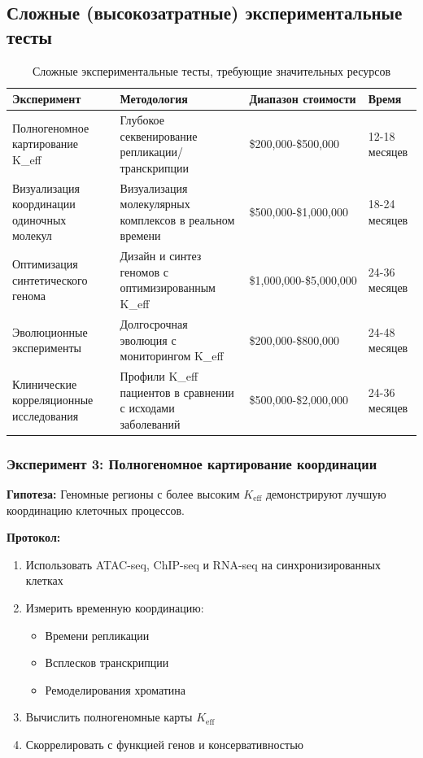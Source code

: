 \documentclass[12pt]{article}
\begin{document}
	\subsection{Сложные (высокозатратные) экспериментальные тесты}
	
	\begin{table}[H]
		\centering
		\caption{Сложные экспериментальные тесты, требующие значительных ресурсов}
		\begin{tabular}{p{4cm}p{5cm}p{3cm}p{2cm}}
			\toprule
			\textbf{Эксперимент} & \textbf{Методология} & \textbf{Диапазон стоимости} & \textbf{Время} \\
			\midrule
			Полногеномное картирование K\_eff & Глубокое секвенирование репликации/транскрипции & \$200,000-\$500,000 & 12-18 месяцев \\
			Визуализация координации одиночных молекул & Визуализация молекулярных комплексов в реальном времени & \$500,000-\$1,000,000 & 18-24 месяцев \\
			Оптимизация синтетического генома & Дизайн и синтез геномов с оптимизированным K\_eff & \$1,000,000-\$5,000,000 & 24-36 месяцев \\
			Эволюционные эксперименты & Долгосрочная эволюция с мониторингом K\_eff & \$200,000-\$800,000 & 24-48 месяцев \\
			Клинические корреляционные исследования & Профили K\_eff пациентов в сравнении с исходами заболеваний & \$500,000-\$2,000,000 & 24-36 месяцев \\
			\bottomrule
		\end{tabular}
	\end{table}
	
	\subsubsection{Эксперимент 3: Полногеномное картирование координации}
	\textbf{Гипотеза:} Геномные регионы с более высоким $K_{\text{eff}}$ демонстрируют лучшую координацию клеточных процессов.
	
	\textbf{Протокол:}
	\begin{enumerate}
		\item Использовать ATAC-seq, ChIP-seq и RNA-seq на синхронизированных клетках
		\item Измерить временную координацию:
		\begin{itemize}
			\item Времени репликации
			\item Всплесков транскрипции
			\item Ремоделирования хроматина
		\end{itemize}
		\item Вычислить полногеномные карты $K_{\text{eff}}$
		\item Скоррелировать с функцией генов и консервативностью
	\end{enumerate}
	
\end{document}

